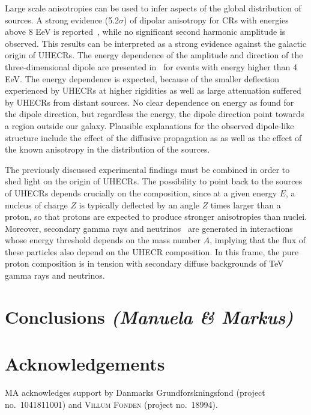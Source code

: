 \documentclass{PoS}
\begin{document}
Large scale anisotropies can be used to infer aspects of the global distribution of sources. A strong evidence (5.2$\sigma$) of dipolar anisotropy for CRs with energies above 8 EeV is reported~\cite{Aab:2017tyv}, while no significant second harmonic amplitude is observed. This results can be interpreted as a strong evidence against the galactic origin of UHECRs. The energy dependence of the amplitude and direction of the three-dimensional dipole are presented in~\cite{Aab:2018mmi} for events with energy higher than 4 EeV. The energy dependence is expected, because of the smaller deflection experienced
by UHECRs at higher rigidities as well as large attenuation suffered by UHECRs from distant sources.  No clear dependence on energy as found for the dipole direction, but regardless the energy, the dipole direction point towards a region outside our galaxy. 
Plausible explanations for the observed dipole-like structure
include the effect of the diffusive propagation as 
as well as the effect of the known anisotropy in the distribution of the sources. 



The previously discussed experimental findings must be combined in order to shed light on the origin of UHECRs. The possibility to point back to the sources of UHECRs depends crucially on the composition, since  
at a given energy $E$, a nucleus of charge $Z$ is typically deflected by an angle $Z$ times larger than a proton, so that protons are expected to produce stronger anisotropies than nuclei. 
Moreover, secondary gamma rays and neutrinos~\cite{AlvesBatista} are generated in 
interactions whose energy threshold depends on the mass number $A$, implying that the flux of these particles also depend on the UHECR composition. In this frame, the pure proton composition is in tension with secondary diffuse backgrounds of TeV gamma rays and neutrinos. 

\section{Conclusions {\it (Manuela \& Markus)}}


\section*{Acknowledgements}
MA acknowledges support by Danmarks Grundforskningsfond (project no.~1041811001) and \textsc{Villum Fonden} (project no.~18994).



\end{document}
